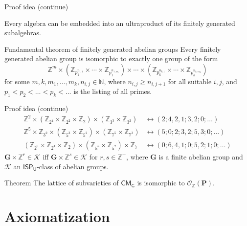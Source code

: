 \documentclass[professionalfont, handout, 12pt]{beamer} %
\theoremstyle{plain}
\theoremstyle{definition}
\newcommand{\m}[1]{{\mathbf {#1} }}
\newcommand{\bb}[1]{\mathbb {#1}}
\begin{document}
\begin{frame}{Proof idea (continue)}
    \begin{block}{}
        Every algebra can be embedded into an ultraproduct of its finitely generated subalgebras.
    \end{block}
    \pause
    \medskip
    
    \begin{block}{Fundamental theorem of finitely generated abelian groups}
        Every finitely generated abelian group is isomorphic to exactly one group of the form
        \[
            \mathbb{Z}^m \times (\mathbb{Z}_{p_1^{n_{1, 1}}} \times \cdots \times \mathbb{Z}_{p_1^{n_{1,m_1}}}) \times \cdots \times (\mathbb{Z}_{p_k^{n_{k, 1}}} \times \cdots \times \mathbb{Z}_{p_k^{n_{k,m_k}}})  
        \]
        for some $m, k, m_1, \dots, m_k,n_{i,j} \in \mathbb{N}$, where $n_{i,j} \geq n_{i,j+1}$ for all suitable $i, j$, and $p_1 < p_2 < \dots < p_k < \ldots $ is the listing of all primes.
    \end{block}    
\end{frame}

\begin{frame}{Proof idea (continue)}
    \begin{align*}
        \mathbb{Z}^2 \times (\mathbb{Z}_{2^4} \times \bb{Z}_{2^2} \times \bb{Z}_2) \times (\bb{Z}_{3^3} \times \bb{Z}_{3^2}) & \leftrightarrow (2; 4, 2, 1; 3, 2; 0; \dots)\\
        \mathbb{Z}^5 \times \mathbb{Z}_{3^2} \times (\bb{Z}_{5^3} \times \bb{Z}_{5^2}) \times (\bb{Z}_{7^5} \times \bb{Z}_{7^3}) & \leftrightarrow (5; 0; 2; 3, 2; 5, 3; 0; \dots)\\
        (\mathbb{Z}_{2^6} \times \mathbb{Z}_{2^4} \times \mathbb{Z}_2) \times (\bb{Z}_{5^5} \times \bb{Z}_{5^2}) \times \bb{Z}_7 & \leftrightarrow (0; 6, 4, 1; 0; 5, 2; 1; 0; \dots)
    \end{align*}
    \pause
    $\m G \times \mathbb{Z}^r \in \mathcal{K}$ iff $\m G \times \mathbb{Z}^s \in \mathcal{K}$ for $r, s \in \bb{Z}^+$, where $\m G$ is a finite abelian group and $\mathcal{K}$ an $\mathsf{ISP_U}$-class of abelian groups.\pause
    \medskip

    \begin{block}{Theorem}
        The lattice of subvarieties of $\mathsf{CM_G}$ is isomorphic to $\mathcal{O}_{\bb{Z}}(\m P)$.
    \end{block}
\end{frame}

\section{Axiomatization}
\end{document}
